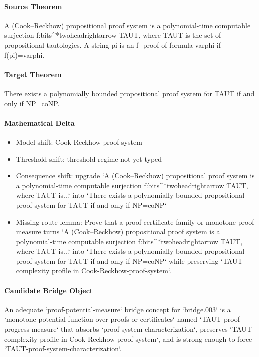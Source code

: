 \documentclass[11pt]{article}
\begin{document}
\paragraph{Source Theorem}
A (Cook--Reckhow) propositional proof system is a polynomial-time computable surjection f:bits\textasciicircum{}*twoheadrightarrow TAUT, where TAUT is the set of propositional tautologies. A string pi is an f -proof of formula varphi if f(pi)=varphi.
\paragraph{Target Theorem}
There exists a polynomially bounded propositional proof system for TAUT if and only if NP=coNP.
\paragraph{Mathematical Delta}
\begin{itemize}
\item Model shift: Cook-Reckhow-proof-system
\item Threshold shift: threshold regime not yet typed
\item Consequence shift: upgrade `A (Cook--Reckhow) propositional proof system is a polynomial-time computable surjection f:bits\textasciicircum{}*twoheadrightarrow TAUT, where TAUT is...` into `There exists a polynomially bounded propositional proof system for TAUT if and only if NP=coNP`
\item Missing route lemma: Prove that a proof certificate family or monotone proof measure turns `A (Cook--Reckhow) propositional proof system is a polynomial-time computable surjection f:bits\textasciicircum{}*twoheadrightarrow TAUT, where TAUT is...` into `There exists a polynomially bounded propositional proof system for TAUT if and only if NP=coNP` while preserving `TAUT complexity profile in Cook-Reckhow-proof-system`.
\end{itemize}
\paragraph{Candidate Bridge Object}
An adequate `proof-potential-measure` bridge concept for `bridge.003` is a `monotone potential function over proofs or certificates` named `TAUT proof progress measure` that absorbs `proof-system-characterization`, preserves `TAUT complexity profile in Cook-Reckhow-proof-system`, and is strong enough to force `TAUT-proof-system-characterization`.
\end{document}
